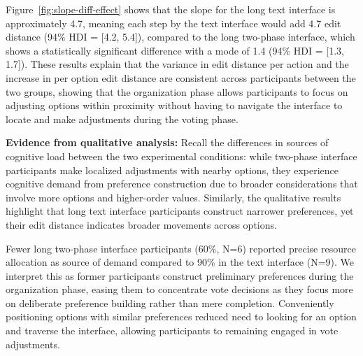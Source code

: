 Figure~\ref{fig:slope-diff-effect} shows that the slope for the long text interface is approximately 4.7, meaning each step by the text interface would add 4.7 edit distance (94\% HDI = [4.2, 5.4]), compared to the long two-phase interface, which shows a statistically significant difference with a mode of 1.4 (94\% HDI = [1.3, 1.7]). These results explain that the variance in edit distance per action and the increase in per option edit distance are consistent across participants between the two groups, showing that the organization phase allows participants to focus on adjusting options within proximity without having to navigate the interface to locate and make adjustments during the voting phase.

\textbf{Evidence from qualitative analysis:} Recall the differences in sources of cognitive load between the two experimental conditions: while two-phase interface participants make localized adjustments with nearby options, they experience cognitive demand from preference construction due to broader considerations that involve more options and higher-order values. Similarly, the qualitative results highlight that long text interface participants construct narrower preferences, yet their edit distance indicates broader movements across options.

Fewer long two-phase interface participants (60\%, N=6) reported precise resource allocation as source of demand compared to 90\% in the text interface (N=9). We interpret this as former participants construct preliminary preferences during the organization phase, easing them to concentrate vote decisions as they focus more on deliberate preference building rather than mere completion. Conveniently positioning options with similar preferences reduced need to looking for an option and traverse the interface, allowing participants to remaining engaged in vote adjustments.

